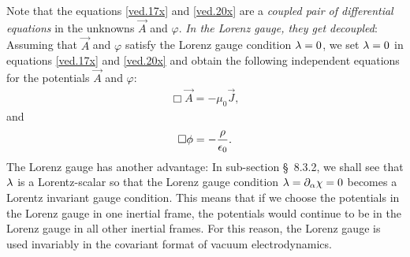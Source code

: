 Note that the equations \eqref{ved.17x} and \eqref{ved.20x} 
are a \textsl{coupled pair of differential equations} in the 
unknowns $\vec{A}$ and $\varphi$. \textsl{In the Lorenz 
gauge, they get decoupled}: Assuming that $\vec{A}$ and 
$\varphi$ satisfy the Lorenz gauge condition ${\lambda}=0$, we 
set ${\lambda}=0$ in equations \eqref{ved.17x} and 
\eqref{ved.20x} and obtain the following independent 
equations for the potentials $\vec{A}$ and $\varphi$: 
\begin{align}\label{ved.26x}
\Box\vec{A}= -\mu_0\vec{J},
\end{align}
and
\begin{align}\label{ved.27x}
\Box \phi= -\frac{\rho}{\epsilon_0}.
\end{align}
The Lorenz gauge has another advantage: In sub-section 
\S~8.3.2, we shall see that ${\lambda}$ is a Lorentz-scalar so 
that the Lorenz gauge condition ${\lambda}={\partial}_{{\alpha}} {\chi}=0$ 
becomes a Lorentz invariant gauge condition. This means 
that 
if we choose the potentials in the Lorenz gauge in one 
inertial frame, the potentials would continue to be in the 
Lorenz gauge in all other inertial frames. For this reason, 
the Lorenz gauge is used invariably in the covariant format 
of vacuum electrodynamics.

